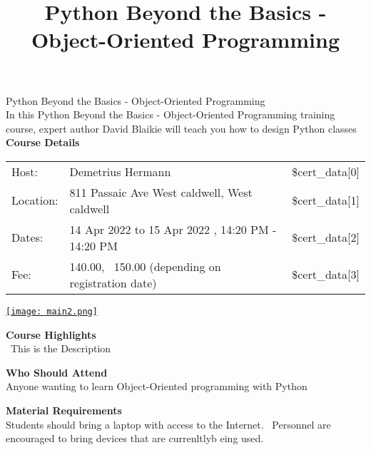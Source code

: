 \documentclass[legalpaper,10pt]{article}
\title{Python Beyond the Basics - Object-Oriented Programming}
\author{}
\date{}
\begin{document}
\maketitle

Python Beyond the Basics - Object-Oriented Programming\\
In this Python Beyond the Basics - Object-Oriented Programming training course, expert author David Blaikie will teach you how to design Python classes\\

\textbf{Course Details}

\begin{longtable}[]{@{}llr@{}}
\toprule
\endhead
Host: & Demetrius Hermann & \$cert\_data{[}0{]} \\
Location: & 811 Passaic Ave  West caldwell,
West caldwell & \$cert\_data{[}1{]} \\
Dates: & 14 Apr 2022 to 15 Apr 2022 , 14:20 PM - 14:20 PM & \$cert\_data{[}2{]} \\
Fee: & \num{140.00}, \ 
\num{150.00} (depending on registration date) &
\$cert\_data{[}3{]} \\
\bottomrule
\end{longtable}

\begin{center}
\graphicspath{{C:/Users/jampu/Desktop/backend/xbackend/static/}}
\href{https://www.policetechnical.com/register/?id='.$classInfo\%5B'id'\%5D.'}
{\texttt{[image: main2.png]}}
\end{center}

\textbf{Course Highlights}\\
\ This is the Description

\textbf{Who Should Attend}\\
Anyone wanting to learn Object-Oriented programming with Python

\textbf{Material Requirements}\\
Students should bring a laptop with access to the Internet. ~Personnel
are encouraged to bring devices that are currenltlyb eing used.
\end{document}
